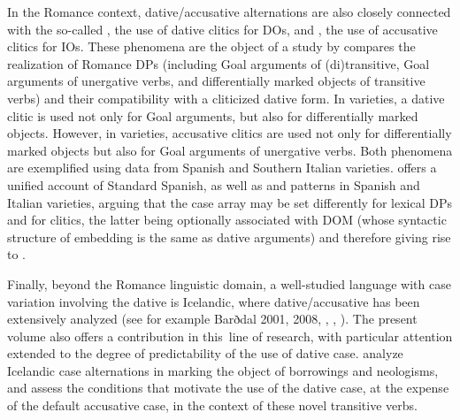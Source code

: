 \documentclass[output=paper,modfonts,nonflat]{langsci/langscibook}
\begin{document}
\begin{styleBodyA}
In the Romance context, dative/accusative alternations are also closely connected with the so-called , the use of dative clitics for DOs, and , the use of accusative clitics for IOs. These phenomena are the object of a study by compares the realization of Romance DPs (including Goal arguments of (di)transitive, Goal arguments of unergative verbs, and differentially marked objects of transitive verbs) and their compatibility with a cliticized dative form. In varieties, a dative clitic is used not only for Goal arguments, but also for differentially marked objects. However, in  varieties, accusative clitics are used not only for differentially marked objects but also for Goal arguments of unergative verbs. Both phenomena are exemplified using data from Spanish and Southern Italian varieties.  offers a unified account of Standard Spanish, as well as  and  patterns in Spanish and Italian varieties, arguing that the case array may be set differently for lexical DPs and for clitics, the latter being optionally associated with DOM (whose syntactic structure of embedding is the same as  dative arguments) and therefore giving rise to .
\end{styleBodyA}

\begin{styleNormalWeb}
Finally, beyond the Romance linguistic domain, a well-studied language with case variation involving the dative is Icelandic, where dative/accusative has been extensively analyzed (see for example Barðdal 2001, 2008, \citealt{Svenonius2002}, \citealt{Maling2002}, \citealt{JónssonEythórsson2005}). The present volume also offers a contribution in this~line of research, with particular attention extended to the degree of predictability of the use of dative case.  analyze Icelandic case alternations in marking the object of borrowings and neologisms, and assess the conditions that motivate the use of the dative case, at the expense of the default accusative case, in the context of these novel transitive verbs. 
\end{styleNormalWeb}
\end{document}
